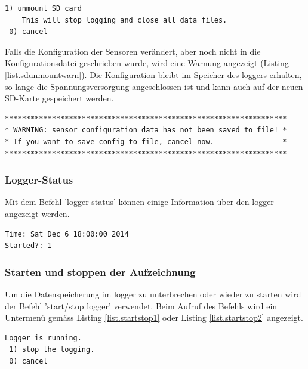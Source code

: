\begin{lstlisting}[caption=Untermenü SD-Karte abmelden, label=list.sdunmount]
 1) unmount SD card
    This will stop logging and close all data files.
 0) cancel
\end{lstlisting}

Falls die Konfiguration der Sensoren verändert, aber noch nicht in die Konfigurationsdatei geschrieben wurde, wird eine Warnung angezeigt (Listing \ref{list.sdunmountwarn}). Die Konfiguration bleibt im Speicher des \gls{logger}s erhalten, so lange die Spannungsversorgung angeschlossen ist und kann auch auf der neuen SD-Karte gespeichert werden.

\begin{lstlisting}[caption=Warnung vor SD-Karte abmelden bei ungespeicherter Konfiguration, label=list.sdunmountwarn]
******************************************************************
* WARNING: sensor configuration data has not been saved to file! *
* If you want to save config to file, cancel now.                *
******************************************************************
\end{lstlisting}

\subsubsection{Logger-Status}\label{sssec.loggerstate}
Mit dem Befehl 'logger status' können einige Information über den \gls{logger} angezeigt werden.

\begin{lstlisting}[caption=Untermenü Logger-Status, label=list.loggerstatus]
Time: Sat Dec 6 18:00:00 2014
Started?: 1
\end{lstlisting}


\subsubsection{Starten und stoppen der Aufzeichnung}\label{sssec.startstop}
Um die Datenspeicherung im \gls{logger} zu unterbrechen oder wieder zu starten wird der Befehl 'start/stop logger' verwendet. Beim Aufruf des Befehls wird ein Untermenü gemäss Listing \ref{list.startstop1} oder Listing \ref{list.startstop2} angezeigt.

\begin{lstlisting}[caption=Untermenü Stoppen der Aufzeichnung, label=list.startstop1]
 Logger is running.
 1) stop the logging.
 0) cancel
\end{lstlisting}

